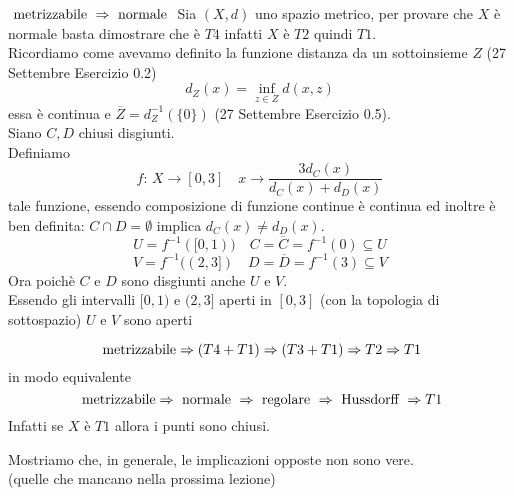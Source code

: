 \begin{prop} $\text{ metrizzabile } \Rightarrow \text{ normale }$
\proof Sia $(X,d)$ uno spazio metrico, per provare che $X$ \`e normale basta dimostrare che \`e $T4$ infatti $X$ \`e $T2$ quindi $T1$.\\
Ricordiamo come avevamo definito la funzione distanza da un sottoinsieme $Z$ (27 Settembre Esercizio 0.2) 
$$ d_Z(x)=\inf_{z\in Z } d(x,z)$$ 
 essa \`e continua e $ \overline{Z}=d_Z^{-1}(\{0\}) $ (27 Settembre Esercizio 0.5).\\
Siano $C,D$ chiusi disgiunti.\\
Definiamo  $$ f :\, X \to [0,3] \quad x \to \frac{3d_C(x)}{d_C(x)+d_D(x)} $$
tale funzione, essendo composizione di funzione continue \`e continua ed inoltre \`e ben definita: $C\cap D =\emptyset $ implica $d_C(x) \neq d_D(x)$.\\

$$U=f^{-1}([0,1)) \quad C=\overline{C}=f^{-1}(0) \subseteq U $$
$$V=f^{-1}((2,3]) \quad D=\overline{D}=f^{-1}(3) \subseteq V $$
Ora poich\`e $C$ e $D$ sono disgiunti anche $U$ e $V$.\\
Essendo gli intervalli $[0,1)$ e $(2,3]$ aperti in $[0,3]$ (con la topologia di sottospazio) $U$ e $V$ sono aperti 
\endproof
\end{prop}
\spazio
\begin{oss}
$$ \text{ metrizzabile} \Rightarrow ( T4 + T1 ) \Rightarrow (T3+T1) \Rightarrow T2 \Rightarrow T1 $$
in modo equivalente
$$ \text{ metrizzabile} \Rightarrow \text{ normale } \Rightarrow \text{ regolare } \Rightarrow \text{ Hussdorff } \Rightarrow T1$$
Infatti se $X$ \`e $T1$ allora i punti sono chiusi.
\end{oss}
Mostriamo che, in generale, le implicazioni opposte non sono vere.\\
(quelle che mancano nella prossima lezione)
